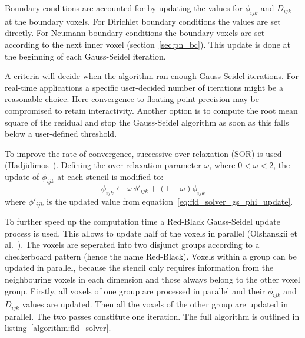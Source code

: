 Boundary conditions are accounted for by updating the values for $\phi_{ijk}$ and $D_{ijk}$ at the boundary voxels. For Dirichlet boundary conditions the values are set directly. For Neumann boundary conditions the boundary voxels are set according to the next inner voxel (section~\ref{sec:pn_bc}). This update is done at the beginning of each Gauss-Seidel iteration.

A criteria will decide when the algorithm ran enough Gauss-Seidel iterations. For real-time applications a specific user-decided number of iterations might be a reasonable choice. Here convergence to floating-point precision may be compromised to retain interactivity. Another option is to compute the root mean square of the residual and stop the Gauss-Seidel algorithm as soon as this falls below a user-defined threshold.

To improve the rate of convergence, successive over-relaxation (SOR) is used (Hadjidimos~\cite{Hadjidimos00}). Defining the over-relaxation parameter $\omega$, where $0<\omega<2$, the update of $\phi_{ijk}$ at each stencil is modified to:
\begin{equation}
\label{eq:fld_solver_sor_update}
\phi_{ijk} \leftarrow \omega \,\phi'_{ijk} + (1-\omega)\phi_{ijk} 
\end{equation}
where $\phi'_{ijk}$ is the updated value from equation~\ref{eq:fld_solver_gs_phi_update}.

To further speed up the computation time a Red-Black Gauss-Seidel update process is used. This allows to update half of the voxels in parallel (Olshanskii et al.~\cite{Olshanskii14}). The voxels are seperated into two disjunct groups according to a checkerboard pattern (hence the name Red-Black). Voxels within a group can be updated in parallel, because the stencil only requires information from the neighbouring voxels in each dimension and those always belong to the other voxel group. Firstly, all voxels of one group are processed in parallel and their $\phi_{ijk}$ and $D_{ijk}$ values are updated. Then all the voxels of the other group are updated in parallel. The two passes constitute one iteration. The full algorithm is outlined in listing~\ref{algorithm:fld_solver}.



